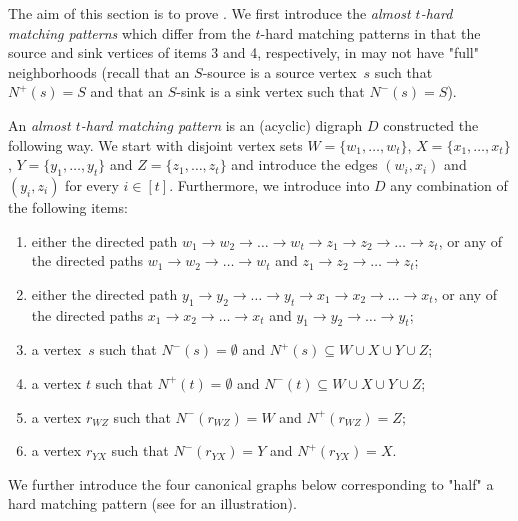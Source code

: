 The aim of this section is to prove . We first introduce the \emph{almost $t$-hard matching patterns} which differ from the $t$-hard matching patterns in that the source and sink vertices of items 3 and 4, respectively, in  may not have "full" neighborhoods (recall that an $S$-source is a source vertex~$s$ such that $N^+(s) = S$ and that an $S$-sink is a sink vertex such that $N^-(s) = S$).

\begin{definition}
\label{def:almost}
An \emph{almost $t$-hard matching pattern} is an (acyclic) digraph $D$ constructed the following way. We start with disjoint vertex sets $W = \{w_1,\ldots,w_t\}$, $X = \{x_1,\ldots,x_t\}$, $Y = \{y_1,\ldots,y_t\}$ and $Z = \{z_1,\ldots,z_t\}$ and introduce the edges $(w_i,x_i)$ and $(y_i,z_i)$ for every $i\in[t]$.
Furthermore, we introduce into $D$ any combination of the following items:
\begin{enumerate}
\item[1.] either the directed path $w_1 \rightarrow w_2 \rightarrow \ldots \rightarrow w_t \rightarrow z_1 \rightarrow z_2 \rightarrow \ldots \rightarrow z_t$, or any of the directed paths $w_1 \rightarrow w_2 \rightarrow \ldots \rightarrow w_t$ and 
$z_1 \rightarrow z_2 \rightarrow \ldots \rightarrow z_t$;
\item[2.] either the directed path $y_1 \rightarrow y_2 \rightarrow \ldots \rightarrow y_t \rightarrow x_1 \rightarrow x_2 \rightarrow \ldots \rightarrow x_t$, or any of the directed paths $x_1 \rightarrow x_2 \rightarrow \ldots \rightarrow x_t$ and $y_1 \rightarrow y_2 \rightarrow \ldots \rightarrow y_t$;
\item[3.] a vertex~$s$ such that $N^-(s) = \emptyset$ and $N^+(s) \subseteq W \cup X \cup Y \cup Z$; 
\item[4.] a vertex $t$ such that $N^+(t) = \emptyset$ and $N^-(t) \subseteq W \cup X \cup Y \cup Z$; 
\item[5.] a vertex $r_{WZ}$ such that $N^-(r_{WZ}) = W$ and $N^+(r_{WZ}) = Z$;
\item[6.] a vertex $r_{YX}$ such that $N^-(r_{YX}) = Y$ and $N^+(r_{YX}) = X$.
\end{enumerate}
\end{definition}

We further introduce the four canonical graphs below corresponding to "half" a hard matching pattern (see  for an illustration).

